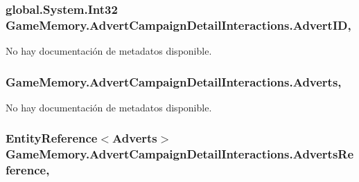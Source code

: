 \hypertarget{class_game_memory_1_1_advert_campaign_detail_interactions_af8c6dda607a3613d809d451f988b3fbe}{
\subsubsection[{Advert\-I\-D}]{\setlength{\rightskip}{0pt plus 5cm}global.\-System.\-Int32 Game\-Memory.\-Advert\-Campaign\-Detail\-Interactions.\-Advert\-I\-D\hspace{0.3cm}{\ttfamily [get]}, {\ttfamily [set]}}}\label{class_game_memory_1_1_advert_campaign_detail_interactions_af8c6dda607a3613d809d451f988b3fbe}


No hay documentación de metadatos disponible. 

\hypertarget{class_game_memory_1_1_advert_campaign_detail_interactions_a9853269aa237b44da178e7952e73a863}{
\subsubsection[{Adverts}]{ Game\-Memory.\-Advert\-Campaign\-Detail\-Interactions.\-Adverts\hspace{0.3cm}{\ttfamily [get]}, {\ttfamily [set]}}}\label{class_game_memory_1_1_advert_campaign_detail_interactions_a9853269aa237b44da178e7952e73a863}


No hay documentación de metadatos disponible. 

\hypertarget{class_game_memory_1_1_advert_campaign_detail_interactions_ab65ca65f335f33f6a635a6799b48db15}{
\subsubsection[{Adverts\-Reference}]{\setlength{\rightskip}{0pt plus 5cm}Entity\-Reference$<${\bf Adverts}$>$ Game\-Memory.\-Advert\-Campaign\-Detail\-Interactions.\-Adverts\-Reference\hspace{0.3cm}{\ttfamily [get]}, {\ttfamily [set]}}}\label{class_game_memory_1_1_advert_campaign_detail_interactions_ab65ca65f335f33f6a635a6799b48db15}


